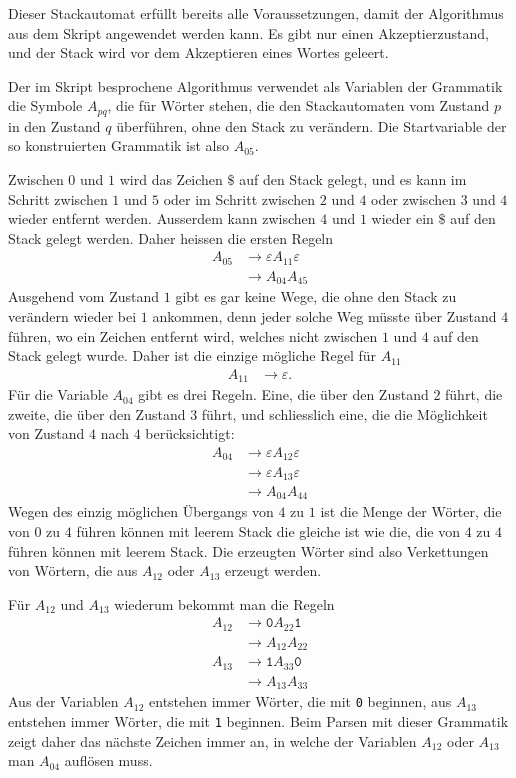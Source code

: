 \begin{loesung}
Dieser Stackautomat erfüllt bereits alle Voraussetzungen, damit
der Algorithmus aus dem Skript angewendet werden kann. Es gibt nur
einen Akzeptierzustand, und der Stack wird vor dem Akzeptieren
eines Wortes geleert.

Der im Skript besprochene Algorithmus verwendet als Variablen der
Grammatik die Symbole $A_{pq}$, die für Wörter stehen, die den
Stackautomaten vom Zustand $p$ in den Zustand $q$ überführen, ohne
den Stack zu verändern. Die Startvariable der so konstruierten Grammatik
ist also $A_{05}$.

Zwischen $0$ und $1$ wird das Zeichen $\texttt{\$}$ auf den Stack gelegt,
und es kann im Schritt zwischen $1$ und $5$ oder im Schritt zwischen $2$
und $4$ oder zwischen $3$ und $4$ wieder entfernt werden. Ausserdem
kann zwischen $4$ und $1$ wieder ein $\texttt{\$}$ auf den Stack gelegt
werden. Daher heissen die ersten Regeln
\begin{align*}
A_{05}&\to \varepsilon A_{11}\varepsilon \\
      &\to A_{04}A_{45}
\end{align*}
Ausgehend vom Zustand $1$ gibt es gar keine Wege, die ohne den Stack zu
verändern wieder bei $1$ ankommen, denn jeder solche Weg müsste über
Zustand $4$ führen, wo ein Zeichen entfernt wird, welches nicht zwischen
$1$ und $4$ auf den Stack gelegt wurde. Daher ist die einzige mögliche
Regel für $A_{11}$
\begin{align*}
A_{11}&\to\varepsilon.
\end{align*}
Für die Variable $A_{04}$ gibt es drei Regeln. Eine, die über den
Zustand $2$ führt, die zweite, die über den Zustand $3$ führt, und
schliesslich eine, die die Möglichkeit von Zustand $4$ nach $4$ 
berücksichtigt:
\begin{align*}
A_{04}&\to \varepsilon A_{12}\varepsilon\\
      &\to \varepsilon A_{13}\varepsilon\\
      &\to A_{04}A_{44}
\end{align*}
Wegen des einzig möglichen Übergangs von $4$ zu $1$ ist die Menge der
Wörter, die von $0$ zu $4$ führen können mit leerem Stack die gleiche
ist wie die, die von $4$ zu $4$ führen können mit leerem Stack.
Die erzeugten Wörter sind also Verkettungen von Wörtern, die
aus $A_{12}$ oder $A_{13}$ erzeugt werden.

Für $A_{12}$ und $A_{13}$ wiederum bekommt man die Regeln
\begin{align*}
A_{12}&\to\texttt{0} A_{22}\texttt{1}\\
      &\to A_{12}A_{22} \\
A_{13}&\to\texttt{1} A_{33}\texttt{0}\\
      &\to A_{13}A_{33}
\end{align*}
Aus der Variablen $A_{12}$ entstehen immer Wörter, die mit \texttt{0}
beginnen, aus $A_{13}$ entstehen immer Wörter, die mit \texttt{1}
beginnen.
Beim Parsen mit dieser Grammatik zeigt daher das nächste Zeichen
immer an, in welche der Variablen $A_{12}$ oder $A_{13}$ man $A_{04}$
auflösen muss.


\end{loesung}
